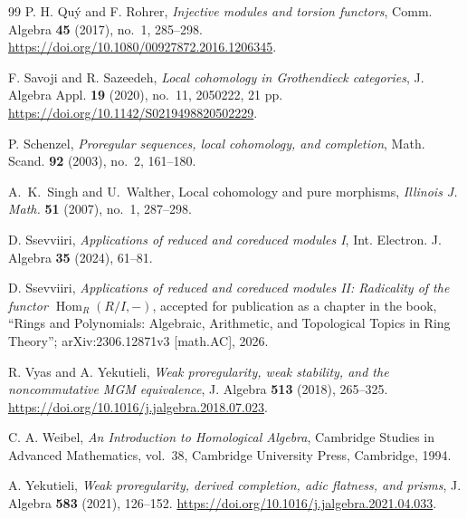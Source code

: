 \documentclass[11pt,reqno]{amsart}
\theoremstyle{definition}
\theoremstyle{remark}
\newcommand{\Hom}{\operatorname{Hom}}
\begin{document}
\begin{thebibliography}{99}
 P. H. Qu\'y and F. Rohrer, \emph{Injective modules and torsion functors}, Comm. Algebra \textbf{45} (2017), no.~1, 285--298. \url{https://doi.org/10.1080/00927872.2016.1206345}.

 F. Savoji and R. Sazeedeh, \emph{Local cohomology in Grothendieck categories}, J. Algebra Appl. \textbf{19} (2020), no.~11, 2050222, 21 pp. \url{https://doi.org/10.1142/S0219498820502229}.

 P. Schenzel, \emph{Proregular sequences, local cohomology, and completion}, Math. Scand. \textbf{92} (2003), no.~2, 161--180.

 A.~K.~Singh and U.~Walther, Local cohomology and pure morphisms, \textit{Illinois J. Math.} \textbf{51} (2007), no.~1, 287--298.

 D. Ssevviiri, \emph{Applications of reduced and coreduced modules I}, Int. Electron. J. Algebra \textbf{35} (2024), 61--81.

 D. Ssevviiri, \emph{Applications of reduced and coreduced modules II: Radicality of the functor $\Hom_R(R/I,-)$},  accepted for publication as a chapter in the book, ``Rings and Polynomials: Algebraic, Arithmetic, and Topological Topics in Ring Theory''; arXiv:2306.12871v3 [math.AC], 2026.

 R. Vyas and A. Yekutieli, \emph{Weak proregularity, weak stability, and the noncommutative MGM equivalence}, J. Algebra \textbf{513} (2018), 265--325. \url{https://doi.org/10.1016/j.jalgebra.2018.07.023}.

 C. A. Weibel, \emph{An Introduction to Homological Algebra}, Cambridge Studies in Advanced Mathematics, vol.~38, Cambridge University Press, Cambridge, 1994.

 A. Yekutieli, \emph{Weak proregularity, derived completion, adic flatness, and prisms}, J. Algebra \textbf{583} (2021), 126--152. \url{https://doi.org/10.1016/j.jalgebra.2021.04.033}.

\end{thebibliography}
\end{document}
